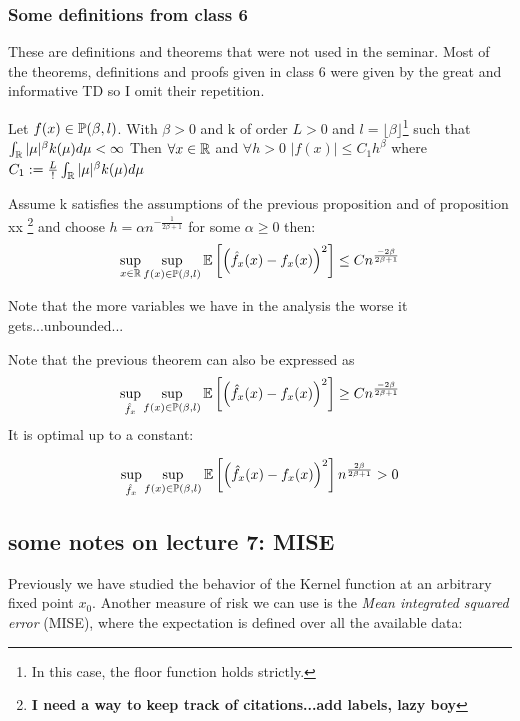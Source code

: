 \documentclass{article}
\begin{document}
\subsubsection{Some definitions from class 6}
These are definitions and theorems that were not used in the seminar. Most of the theorems, definitions and proofs given in class 6 were given by the great and informative TD so I omit their repetition. 
\begin{proposition}
    Let \(f(x)\in \mathbb{P}(\beta, l)\). With \(\beta>0\) and k of order \(L>0\) and \(l=\lfloor \beta \rfloor\)\footnote{In this case, the floor function holds strictly.} such that \(\int_{\mathbb{R}}|\mu|^{\beta} k(\mu) d\mu <\infty\) Then \(\forall x \in \mathbb{R}\) and \(\forall h>0\) \(|f(x)|\leq C_{1}h^{\beta}\) where \(C_{1}:=\frac{L}{!}\int_{\mathbb{R}}|\mu|^{\beta} k(\mu) d\mu\)
\end{proposition}

\begin{theorem}
    Assume k satisfies the assumptions of the previous proposition and of proposition xx \footnote{\textbf{I need a way to keep track of citations...add labels, lazy boy}} and choose \(h=\alpha n^{-\frac{1}{2\beta + 1}}\) for some \(\alpha \geq 0\) then: 
    \[
        \sup_{x \in \mathbb{R}} \sup_{f(x) \in \mathbb{P}(\beta , l)} \mathbb{E} \left[ \left(\hat{f}_{x}(x)-f_{x}(x)\right)^{2}\right] \leq C n^{\frac{-2\beta}{2\beta+1}} \]

    
\end{theorem}
Note that the more variables we have in the analysis the  worse it gets...unbounded...

\begin{remark}
    Note that the previous theorem can also be expressed as \[ 
    \sup_{\hat{f}_x} \sup_{f(x) \in \mathbb{P}(\beta , l)} \mathbb{E} \left[ \left(\hat{f}_{x}(x)-f_{x}(x)\right)^{2}\right] \geq C n^{\frac{-2\beta}{2\beta+1}}
    \]
    It is optimal up to a constant: 


    \[
    \sup_{\hat{f}_x} \sup_{f(x) \in \mathbb{P}(\beta , l)} \mathbb{E} \left[ \left(\hat{f}_{x}(x)-f_{x}(x)\right)^{2}\right] n^{\frac{2\beta}{2\beta+1}} > 0 
    \]
\end{remark}

\subsection{some notes on lecture 7: MISE}


Previously we have studied the behavior of the Kernel function at an arbitrary fixed point \(x_0\). Another measure of risk we can use is the \textit{Mean integrated squared error} (MISE), where the expectation is defined over all the available data:
\end{document}
